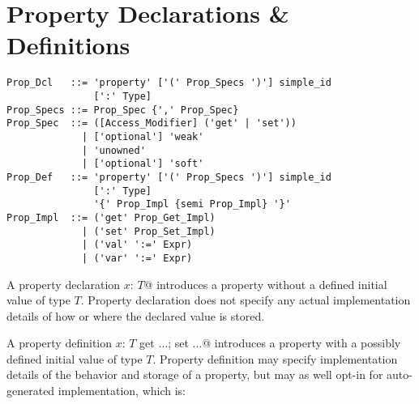 \section{Property Declarations \& Definitions}
\label{sec:property-dec-dfn}

\syntax\begin{lstlisting}
Prop_Dcl   ::= 'property' ['(' Prop_Specs ')'] simple_id 
               [':' Type]
Prop_Specs ::= Prop_Spec {',' Prop_Spec}
Prop_Spec  ::= ([Access_Modifier] ('get' | 'set')) 
             | ['optional'] 'weak'
             | 'unowned'
             | ['optional'] 'soft'
Prop_Def   ::= 'property' ['(' Prop_Specs ')'] simple_id 
               [':' Type]
               '{' Prop_Impl {semi Prop_Impl} '}'
Prop_Impl  ::= ('get' Prop_Get_Impl)
             | ('set' Prop_Set_Impl)
             | ('val' ':=' Expr)
             | ('var' ':=' Expr)
\end{lstlisting} %

A property declaration \lstinline@property $x$: $T$@ introduces a property without a defined initial value of type $T$. Property declaration does not specify any actual implementation details of how or where the declared value is stored.

A property definition \lstinline@property $x$: $T$ {get $\ldots$; set $\ldots$}@ introduces a property with a possibly defined initial value of type $T$. Property definition may specify implementation details of the behavior and storage of a property, but may as well opt-in for auto-generated implementation, which is: 

